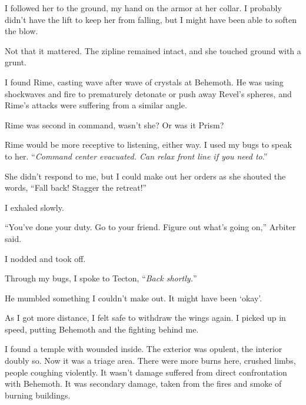 I followed her to the ground, my hand on the armor at her collar.  I probably didn't have the lift to keep her from falling, but I might have been able to soften the blow.



Not that it mattered.  The zipline remained intact, and she touched ground with a grunt.



I found Rime, casting wave after wave of crystals at Behemoth.  He was using shockwaves and fire to prematurely detonate or push away Revel's spheres, and Rime's attacks were suffering from a similar angle.



Rime was second in command, wasn't she?  Or was it Prism?



Rime would be more receptive to listening, either way.  I used my bugs to speak to her.  ``\emph{Command center evacuated.  Can relax front line if you need to}.''



She didn't respond to me, but I could make out her orders as she shouted the words, ``Fall back!  Stagger the retreat!''



I exhaled slowly.



``You've done your duty.  Go to your friend.  Figure out what's going on,'' Arbiter said.



I nodded and took off.



Through my bugs, I spoke to Tecton, ``\emph{Back shortly.}''



He mumbled something I couldn't make out.  It might have been `okay'.



As I got more distance, I felt safe to withdraw the wings again.  I picked up in speed, putting Behemoth and the fighting behind me.



I found a temple with wounded inside.  The exterior was opulent, the interior doubly so.  Now it was a triage area.  There were more burns here, crushed limbs, people coughing violently.  It wasn't damage suffered from direct confrontation with Behemoth.  It was secondary damage, taken from the fires and smoke of burning buildings.



